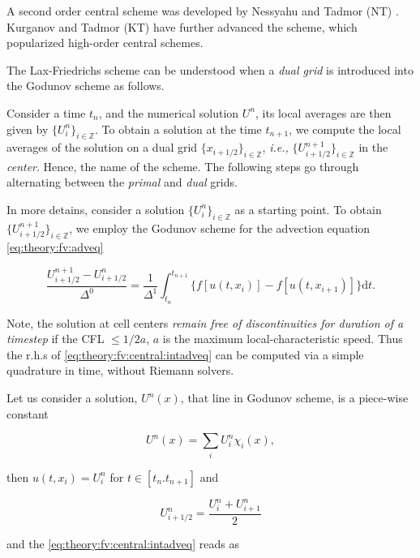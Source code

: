 A second order central scheme was developed by Nessyahu and Tadmor (NT) \cite{Nessyahu:1990}. Kurganov and Tadmor (KT) \cite{Kurganov:2000} have further advanced the scheme, which popularized high-order central schemes. 

The Lax-Friedrichs scheme can be understood when a \textit{dual grid} is introduced into the Godunov scheme as follows. 

Consider a time $t_n$, and the numerical solution $U^n$, its local averages are then given by $\{U_{i}^{n}\}_{i\in \mathbb{Z}}$. To obtain a solution at the time $t_{n+1}$, we compute the local averages of the solution on a dual grid $\{x_{i+1/2}\}_{i\in\mathbb{Z}}$, \textit{i.e.,} $\{U_{i+1/2}^{n+1}\}_{i\in\mathbb{Z}}$ in the \textit{center}. Hence, the name of the scheme. 
The following steps go through alternating between the \textit{primal} and \textit{dual} grids. 

In more detains, consider a solution $\{U_{i}^{n}\}_{i\in \mathbb{Z}}$ as a starting point. 
To obtain $\{U_{i+1/2}^{n+1}\}_{i\in \mathbb{Z}}$, we employ the Godunov scheme for the advection equation \ref{eq:theory:fv:adveq} 

\begin{equation}
\frac{U_{i+1/2}^{n+1} - U_{i+1/2}^{n}}{\Delta^0} = \frac{1}{\Delta^1}\int_{t_n}^{t_{n+1}}\big\{ f[u(t,x_i)] -f[u(t,x_{i+1})]  \big\}\text{d}t.
\label{eq:theory:fv:central:intadveq}
\end{equation}

Note, the solution at cell centers \textit{remain free of discontinuities for duration of a timestep} if the CFL $\leq 1/2 a$, $a$ is the maximum local-characteristic speed. Thus the r.h.s of \ref{eq:theory:fv:central:intadveq} can be computed via a simple quadrature in time, without Riemann solvers. 

Let us consider a solution, $U^n(x)$, that line in Godunov scheme, is a piece-wise constant 

\begin{equation}
U^{n}(x) = \sum_i U_{i}^{n}\chi_i(x),
\end{equation}

then $u(t,x_i) = U_{i}^{n}$ for $t\in[t_n. t_{n+1}]$ and 

\begin{equation}
U_{i+1/2}^{n} = \frac{U_i ^n + U_{i+1}^n}{2}
\end{equation}

and the \ref{eq:theory:fv:central:intadveq} reads as

